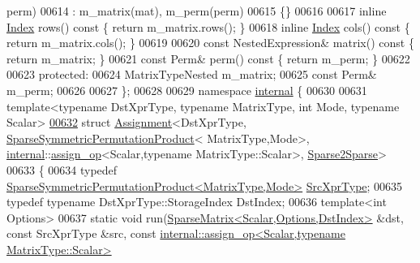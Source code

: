 \begin{DoxyCode}
      perm)
00614       : m\_matrix(mat), m\_perm(perm)
00615     \{\}
00616     
00617     \textcolor{keyword}{inline} \hyperlink{group___core___module_a554f30542cc2316add4b1ea0a492ff02}{Index} rows()\textcolor{keyword}{ const }\{ \textcolor{keywordflow}{return} m\_matrix.rows(); \}
00618     \textcolor{keyword}{inline} \hyperlink{group___core___module_a554f30542cc2316add4b1ea0a492ff02}{Index} cols()\textcolor{keyword}{ const }\{ \textcolor{keywordflow}{return} m\_matrix.cols(); \}
00619         
00620     \textcolor{keyword}{const} NestedExpression& matrix()\textcolor{keyword}{ const }\{ \textcolor{keywordflow}{return} m\_matrix; \}
00621     \textcolor{keyword}{const} Perm& perm()\textcolor{keyword}{ const }\{ \textcolor{keywordflow}{return} m\_perm; \}
00622     
00623   \textcolor{keyword}{protected}:
00624     MatrixTypeNested m\_matrix;
00625     \textcolor{keyword}{const} Perm& m\_perm;
00626 
00627 \};
00628 
00629 \textcolor{keyword}{namespace }\hyperlink{namespaceinternal}{internal} \{
00630   
00631 \textcolor{keyword}{template}<\textcolor{keyword}{typename} DstXprType, \textcolor{keyword}{typename} MatrixType, \textcolor{keywordtype}{int} Mode, \textcolor{keyword}{typename} Scalar>
\hyperlink{struct_eigen_1_1internal_1_1_assignment_3_01_dst_xpr_type_00_01_sparse_symmetric_permutation_pro69955201e4d84b32d17d1959c46119e9}{00632} \textcolor{keyword}{struct }\hyperlink{struct_eigen_1_1internal_1_1_assignment}{Assignment}<DstXprType, \hyperlink{class_eigen_1_1_sparse_symmetric_permutation_product}{SparseSymmetricPermutationProduct}<
      MatrixType,Mode>, \hyperlink{namespaceinternal}{internal}::\hyperlink{struct_eigen_1_1internal_1_1assign__op}{assign\_op}<Scalar,typename MatrixType::Scalar>, 
      \hyperlink{struct_eigen_1_1internal_1_1_sparse2_sparse}{Sparse2Sparse}>
00633 \{
00634   \textcolor{keyword}{typedef} \hyperlink{class_eigen_1_1_sparse_symmetric_permutation_product}{SparseSymmetricPermutationProduct<MatrixType,Mode>}
       \hyperlink{class_eigen_1_1_sparse_symmetric_permutation_product}{SrcXprType};
00635   \textcolor{keyword}{typedef} \textcolor{keyword}{typename} DstXprType::StorageIndex DstIndex;
00636   \textcolor{keyword}{template}<\textcolor{keywordtype}{int} Options>
00637   \textcolor{keyword}{static} \textcolor{keywordtype}{void} run(\hyperlink{group___sparse_core___module_class_eigen_1_1_sparse_matrix}{SparseMatrix<Scalar,Options,DstIndex>} &dst, \textcolor{keyword}{const} 
      SrcXprType &src, \textcolor{keyword}{const} \hyperlink{struct_eigen_1_1internal_1_1assign__op}{internal::assign\_op<Scalar,typename MatrixType::Scalar>}

\end{DoxyCode}
